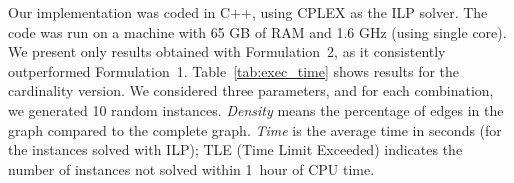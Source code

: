\documentclass[12pt]{article}
\begin{document}
Our implementation was coded in C++, using CPLEX as the ILP solver.
The code was run on a machine with 65 GB of RAM and 1.6 GHz (using
single core).
%
We present only results obtained with Formulation~2, as it
consistently outperformed Formulation~1.  Table~\ref{tab:exec_time}
shows results for the cardinality version. We considered three
parameters, and for each combination, we generated 10 random
instances.  \emph{Density} means the percentage of edges in the graph
compared to the complete graph. \emph{Time} is the average time
in seconds (for the instances solved with ILP); TLE (Time Limit Exceeded)
indicates the number of instances not solved within 1~hour of CPU
time.




\smallskip
\end{document}
